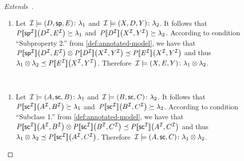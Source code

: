 \begin{proof}[Extends~\citep{MunozPerezGutierrez:2009aa}]
\begin{description}[nosep]
\begin{enumerate}[label=(\alph*),nosep]
    \item Let~$\mathcal{I} \models \mbox{$(D, \mathsf{sp}, E)\colon\lambda_{1}$}$ and~$\mathcal{I} \models \mbox{$(X, D,
          Y)\colon\lambda_{2}$}$.
      It follows that~$\mathit{{P[\![{\mathsf{sp}}^{\mathcal{I}}]\!]}}\!\left({D}^{\mathcal{I}}, {E}^{\mathcal{I}}\right) \succeq \lambda_{1}$
      and~$\mathit{{P[\![{D}^{\mathcal{I}}]\!]}}\!\left({X}^{\mathcal{I}}, {Y}^{\mathcal{I}}\right) \succeq \lambda_{2}$.
      According to condition ``Subproperty 2.'' from \cref{def:annotated-model}, we have
      that~$\fc{\intP{\int{\spp}}}{\int{D}, \int{E}} \otimes \fc{\intP{\int{D}}}{\int{X}, \int{Y}} \preceq
      \fc{\intP{\int{E}}}{\int{X}, \int{Y}}$ and thus~$\lambda_{1} \otimes \lambda_{2} \preceq
      \mathit{{P[\![{E}^{\mathcal{I}}]\!]}}\!\left({X}^{\mathcal{I}}, {Y}^{\mathcal{I}}\right)$.
      Therefore~$\mathcal{I} \models \mbox{$(X, E, Y)\colon\lambda_{1}\otimes\lambda_{2}$}$.
    \end{enumerate}
  \item[3. Subclass:]~ 
    \begin{enumerate}[label=(\alph*),nosep]
    \item Let~$\mathcal{I} \models \mbox{$(A, \mathsf{sc}, B)\colon\lambda_{1}$}$ and~$\mathcal{I} \models \mbox{$(B, \mathsf{sc},
          C)\colon\lambda_{2}$}$.  
      It follows that~$\mathit{{P[\![{\mathsf{sc}}^{\mathcal{I}}]\!]}}\!\left({A}^{\mathcal{I}}, {B}^{\mathcal{I}}\right) \succeq \lambda_{1}$
      and~$\mathit{{P[\![{\mathsf{sc}}^{\mathcal{I}}]\!]}}\!\left({B}^{\mathcal{I}}, {C}^{\mathcal{I}}\right) \succeq \lambda_{2}$.
      According to condition ``Subclass 1.'' from \cref{def:annotated-model}, we have
      that~$\fc{\intP{\int{\subclass}}}{\int{A}, \int{B}} \otimes \fc{\intP{\int{ \subclass}}}{\int{B}, \int{C}} \preceq
      \fc{\intP{\int{\subclass}}}{\int{A}, \int{C}}$ and thus~$\lambda_{1} \otimes \lambda_{2} \preceq
      \mathit{{P[\![{\mathsf{sc}}^{\mathcal{I}}]\!]}}\!\left({A}^{\mathcal{I}}, {C}^{\mathcal{I}}\right)$.
      Therefore~$\mathcal{I} \models \mbox{$(A, \mathsf{sc}, C)\colon\lambda_{1}\otimes\lambda_{2}$}$.


\end{enumerate}
\end{description}
\end{proof}
